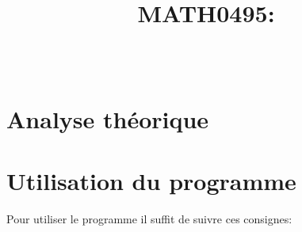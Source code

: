 \documentclass[a4paper, 11pt, oneside]{article}
\title{	MATH0495: \intitule}
\author{\PrenomUN~\textsc{\NomUN}}
\date{}
\begin{document}
\maketitle
\tableofcontents
\newpage


	\section{Analyse théorique}
	
	\section{Utilisation du programme}
	Pour utiliser le programme il suffit de suivre ces consignes:
\end{document}
